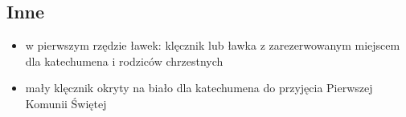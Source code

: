 \subsection{Inne}
\begin{itemize}
	\item w pierwszym rzędzie ławek: klęcznik lub ławka z zarezerwowanym
	      miejscem dla katechumena i rodziców chrzestnych
	\item mały klęcznik okryty na biało dla katechumena do przyjęcia Pierwszej
	      Komunii Świętej
\end{itemize}

